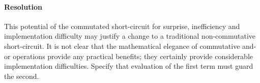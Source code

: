 \documentclass{jot}
\begin{document}
\paragraph{Resolution} 

This potential of the commutated short-circuit for surprise, inefficiency and implementation difficulty may justify a change to a traditional non-commutative short-circuit. It is not clear that the mathematical elegance of commutative and-or operations provide any practical benefits; they certainly provide considerable implementation difficulties. Specify that evaluation of the first term must guard the second.











\end{document}
